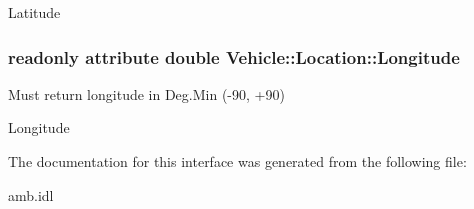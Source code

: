 Latitude \hypertarget{interfaceVehicle_1_1Location_aa6eeb442bbfcdfe357b77d0ace9ffa8e}{
\subsubsection[{Longitude}]{\setlength{\rightskip}{0pt plus 5cm}readonly attribute double Vehicle\-::\-Location\-::\-Longitude}}\label{interfaceVehicle_1_1Location_aa6eeb442bbfcdfe357b77d0ace9ffa8e}


Must return longitude in Deg.\-Min (-\/90, +90) 

Longitude 

The documentation for this interface was generated from the following file\-:\begin{DoxyCompactItemize}
\item 
amb.\-idl\end{DoxyCompactItemize}
